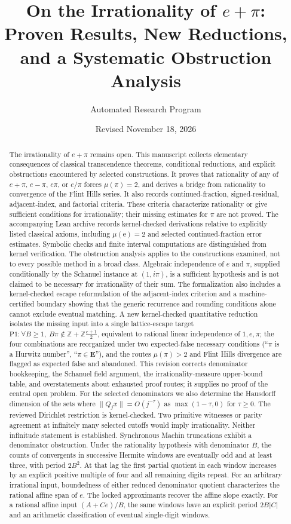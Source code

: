 \documentclass[11pt]{amsart}
\title[On the Irrationality of $e+\pi$]{On the Irrationality of $e+\pi$: Proven Results, New Reductions, and a Systematic Obstruction Analysis}
\author{Automated Research Program}
\date{Revised November 18, 2026}
\theoremstyle{definition}
\theoremstyle{remark}
\numberwithin{equation}{section}
\newcommand{\Z}{\mathbb{Z}}
\newcommand{\irr}{\mu}
\newcommand{\ee}{\mathrm{e}}
\begin{document}
\begin{abstract}
The irrationality of $e+\pi$ remains open. This manuscript collects elementary consequences of classical transcendence theorems, conditional reductions, and explicit obstructions encountered by selected constructions. It proves that rationality of any of $e+\pi$, $e-\pi$, $e\pi$, or $e/\pi$ forces $\irr(\pi)=2$, and derives a bridge from rationality to convergence of the Flint Hills series. It also records continued-fraction, signed-residual, adjacent-index, and factorial criteria. These criteria characterize rationality or give sufficient conditions for irrationality; their missing estimates for $\pi$ are not proved. The accompanying Lean archive records kernel-checked derivations relative to explicitly listed classical axioms, including $\irr(\ee)=2$ and selected continued-fraction error estimates. Symbolic checks and finite interval computations are distinguished from kernel verification. The obstruction analysis applies to the constructions examined, not to every possible method in a broad class. Algebraic independence of $e$ and $\pi$, supplied conditionally by the Schanuel instance at $(1,i\pi)$, is a sufficient hypothesis and is not claimed to be necessary for irrationality of their sum. The formalization also includes a kernel-checked escape reformulation of the adjacent-index criterion and a machine-certified boundary showing that the generic recurrence and rounding conditions alone cannot exclude eventual matching. A new kernel-checked quantitative reduction isolates the missing input into a single lattice-escape target $\mathrm{P1}:\forall B\ge1,\ B\pi\notin\Z+\Z\frac{e+1}{2}$, equivalent to rational linear independence of $1,e,\pi$; the four combinations are reorganized under two expected-false necessary conditions (``$\pi$ is a Hurwitz number'', ``$\pi\in\mathbf{E}$''), and the routes $\irr(\pi)>2$ and Flint Hills divergence are flagged as expected false and abandoned. This revision corrects denominator bookkeeping, the Schanuel field argument, the irrationality-measure upper-bound table, and overstatements about exhausted proof routes; it supplies no proof of the central open problem. For the selected denominators we also determine the Hausdorff dimension of the sets where $\|Q_jx\|=O(j^{-\tau})$ as $\max(1-\tau,0)$ for $\tau\ge0$.
The reviewed Dirichlet restriction is kernel-checked. Two primitive witnesses or parity agreement at infinitely many selected cutoffs would imply irrationality. Neither infinitude statement is established. Synchronous Machin truncations exhibit a denominator obstruction.
Under the rationality hypothesis with denominator $B$, the counts of convergents in successive Hermite windows are eventually odd and at least three, with period $2B^2$. At that lag the first partial quotient in each window increases by an explicit positive multiple of four and all remaining digits repeat.
For an arbitrary irrational input, boundedness of either reduced denominator quotient characterizes the rational affine span of $e$. The locked approximants recover the affine slope exactly.
For a rational affine input $(A+Ce)/B$, the same windows have an
explicit period $2B|C|$ and an arithmetic classification of eventual
single-digit windows.
\end{abstract}
\end{document}
